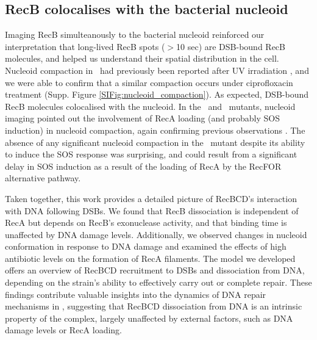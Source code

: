 \subsection*{RecB colocalises with the bacterial nucleoid}
Imaging RecB simulteanously to the bacterial nucleoid reinforced our interpretation that long-lived RecB spots ($>$10 sec) are DSB-bound RecB molecules, and helped us understand their spatial distribution in the cell. Nucleoid compaction in \ecoli\ had previously been reported after UV irradiation \cite{Odsbu2014}, and we were able to confirm that a similar compaction occurs under ciprofloxacin treatment (Supp. Figure \ref{SIFig:nucleoid_compaction}). As expected, DSB-bound RecB molecules colocalised with the nucleoid. In the \dreca\ and \geneteneighty\ mutants, nucleoid imaging pointed out the involvement of RecA loading (and probably SOS induction) in nucleoid compaction, again confirming previous observations \cite{Odsbu2014}. The absence of any significant nucleoid compaction in the \geneteneighty\ mutant despite its ability to induce the SOS response was surprising, and could result from a significant delay in SOS induction as a result of the loading of RecA by the RecFOR alternative pathway.

Taken together, this work provides a detailed picture of RecBCD's interaction with DNA following DSBs. We found that RecB dissociation is independent of RecA but depends on RecB's exonuclease activity, and that binding time is unaffected by DNA damage levels. Additionally, we observed changes in nucleoid conformation in response to DNA damage and examined the effects of high antibiotic levels on the formation of RecA filaments. The model we developed offers an overview of RecBCD recruitment to DSBs and dissociation from DNA, depending on the strain's ability to effectively carry out or complete repair.
These findings contribute valuable insights into the dynamics of DNA repair mechanisms in \ecoli, suggesting that RecBCD dissociation from DNA is an intrinsic property of the complex, largely unaffected by external factors, such as DNA damage levels or RecA loading.